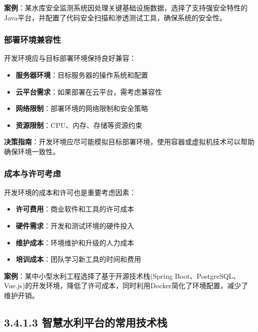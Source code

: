 \textbf{案例}：某水库安全监测系统因处理关键基础设施数据，选择了支持强安全特性的Java平台，并配置了代码安全扫描和渗透测试工具，确保系统的安全性。

\subsubsection{部署环境兼容性}\label{ux90e8ux7f72ux73afux5883ux517cux5bb9ux6027}

开发环境应与目标部署环境保持良好兼容：

\begin{itemize}
\tightlist
\item
  \textbf{服务器环境}：目标服务器的操作系统和配置
\item
  \textbf{云平台需求}：如果部署在云平台，需考虑兼容性
\item
  \textbf{网络限制}：部署环境的网络限制和安全策略
\item
  \textbf{资源限制}：CPU、内存、存储等资源约束
\end{itemize}

\textbf{决策指南}：开发环境应尽可能模拟目标部署环境，使用容器或虚拟机技术可以帮助确保环境一致性。

\subsubsection{成本与许可考虑}\label{ux6210ux672cux4e0eux8bb8ux53efux8003ux8651}

开发环境的成本和许可也是重要考虑因素：

\begin{itemize}
\tightlist
\item
  \textbf{许可费用}：商业软件和工具的许可成本
\item
  \textbf{硬件需求}：开发和测试环境的硬件投入
\item
  \textbf{维护成本}：环境维护和升级的人力成本
\item
  \textbf{培训成本}：团队学习新工具的时间和费用
\end{itemize}

\textbf{案例}：某中小型水利工程选择了基于开源技术栈(Spring
Boot、PostgreSQL、Vue.js)的开发环境，降低了许可成本，同时利用Docker简化了环境配置，减少了维护开销。

\subsection{3.4.1.3
智慧水利平台的常用技术栈}\label{ux667aux6167ux6c34ux5229ux5e73ux53f0ux7684ux5e38ux7528ux6280ux672fux6808}

